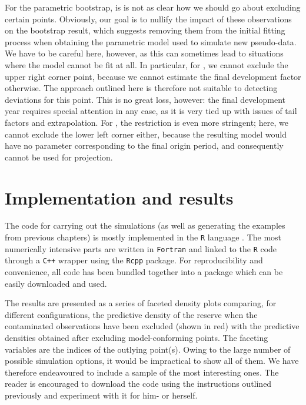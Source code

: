 \documentclass[a4paper]{book}
\begin{document}
For the parametric bootstrap, is is not as clear how we should go about excluding certain points. Obviously, our goal is to nullify the impact of these observations on the bootstrap result, which suggests removing them from the initial fitting process when obtaining the parametric model used to simulate new pseudo-data. We have to be careful here, however, as this can sometimes lead to situations where the model cannot be fit at all. In particular, for , we cannot exclude the upper right corner point, because we cannot estimate the final development factor otherwise. The approach outlined here is therefore not suitable to detecting deviations for this point. This is no great loss, however: the final development year requires special attention in any case, as it is very tied up with issues of tail factors and extrapolation. For , the restriction is even more stringent; here, we cannot exclude the lower left corner either, because the resulting model would have no parameter corresponding to the final origin period, and consequently cannot be used for projection.

\section{Implementation and results}

The code for carrying out the simulations (as well as generating the examples from previous chapters) is mostly implemented in the \texttt{R} language \cite{R}. The most numerically intensive parts are written in \texttt{Fortran} and linked to the \texttt{R} code through a \texttt{C++} wrapper using the \texttt{Rcpp} package. For reproducibility and convenience, all code has been bundled together into a package which can be easily downloaded and used.

The results are presented as a series of faceted density plots comparing, for different configurations, the predictive density of the reserve when the contaminated observations have been excluded (shown in red) with the predictive densities obtained after excluding model-conforming points. The faceting variables are the indices of the outlying point(s). Owing to the large number of possible simulation options, it would be impractical to show all of them. We have therefore endeavoured to include a sample of the most interesting ones. The reader is encouraged to download the code using the instructions outlined previously and experiment with it for him- or herself.
\end{document}
